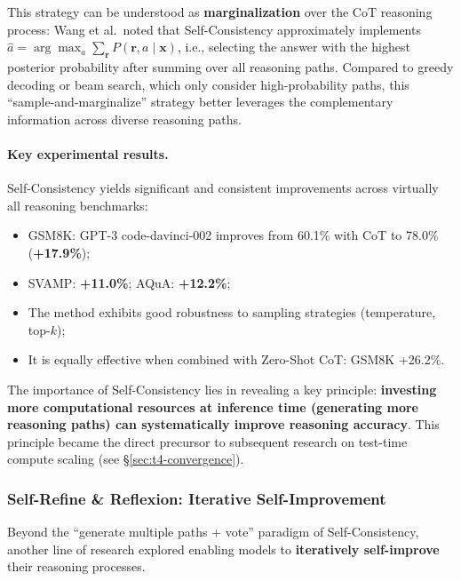 \noindent
This strategy can be understood as \textbf{marginalization} over the CoT reasoning process:
Wang et al.\ noted that Self-Consistency approximately implements
$\hat{a} = \arg\max_a \sum_{\mathbf{r}} P(\mathbf{r}, a \mid \mathbf{x})$,
i.e., selecting the answer with the highest posterior probability after summing over all reasoning paths.
Compared to greedy decoding or beam search, which only consider high-probability paths,
this ``sample-and-marginalize'' strategy better leverages the complementary information across diverse reasoning paths.

\paragraph{Key experimental results.}
Self-Consistency yields significant and consistent improvements across virtually all reasoning benchmarks:
\begin{itemize}[leftmargin=2em]
  \item GSM8K: GPT-3 code-davinci-002 improves from 60.1\% with CoT to 78.0\% (\textbf{+17.9\%});
  \item SVAMP: \textbf{+11.0\%}; AQuA: \textbf{+12.2\%};
  \item The method exhibits good robustness to sampling strategies (temperature, top-$k$);
  \item It is equally effective when combined with Zero-Shot CoT: GSM8K +26.2\%.
\end{itemize}

\noindent
The importance of Self-Consistency lies in revealing a key principle:
\textbf{investing more computational resources at inference time (generating more reasoning paths) can systematically improve reasoning accuracy}.
This principle became the direct precursor to subsequent research on test-time compute scaling (see \S\ref{sec:t4-convergence}).

\subsubsection{Self-Refine \& Reflexion: Iterative Self-Improvement}

Beyond the ``generate multiple paths + vote'' paradigm of Self-Consistency,
another line of research explored enabling models to \textbf{iteratively self-improve} their reasoning processes.

